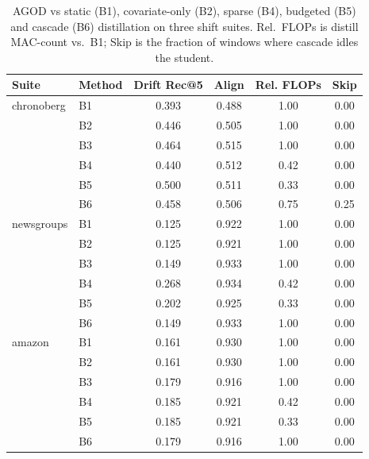 \begin{table}[t]
\centering
\small
\caption{AGOD vs static (B1), covariate-only (B2), sparse (B4), budgeted (B5) and cascade (B6) distillation on three shift suites. Rel.\ FLOPs is distill MAC-count vs.\ B1; Skip is the fraction of windows where cascade idles the student.}
\label{tab:agod-suites}
\begin{tabular}{llcccc}
\toprule
Suite & Method & Drift Rec@5 & Align & Rel. FLOPs & Skip \\
\midrule
chronoberg & B1 & 0.393 & 0.488 & 1.00 & 0.00 \\
 & B2 & 0.446 & 0.505 & 1.00 & 0.00 \\
 & B3 & 0.464 & 0.515 & 1.00 & 0.00 \\
 & B4 & 0.440 & 0.512 & 0.42 & 0.00 \\
 & B5 & 0.500 & 0.511 & 0.33 & 0.00 \\
 & B6 & 0.458 & 0.506 & 0.75 & 0.25 \\
\midrule
newsgroups & B1 & 0.125 & 0.922 & 1.00 & 0.00 \\
 & B2 & 0.125 & 0.921 & 1.00 & 0.00 \\
 & B3 & 0.149 & 0.933 & 1.00 & 0.00 \\
 & B4 & 0.268 & 0.934 & 0.42 & 0.00 \\
 & B5 & 0.202 & 0.925 & 0.33 & 0.00 \\
 & B6 & 0.149 & 0.933 & 1.00 & 0.00 \\
\midrule
amazon & B1 & 0.161 & 0.930 & 1.00 & 0.00 \\
 & B2 & 0.161 & 0.930 & 1.00 & 0.00 \\
 & B3 & 0.179 & 0.916 & 1.00 & 0.00 \\
 & B4 & 0.185 & 0.921 & 0.42 & 0.00 \\
 & B5 & 0.185 & 0.921 & 0.33 & 0.00 \\
 & B6 & 0.179 & 0.916 & 1.00 & 0.00 \\
\bottomrule
\end{tabular}
\end{table}
